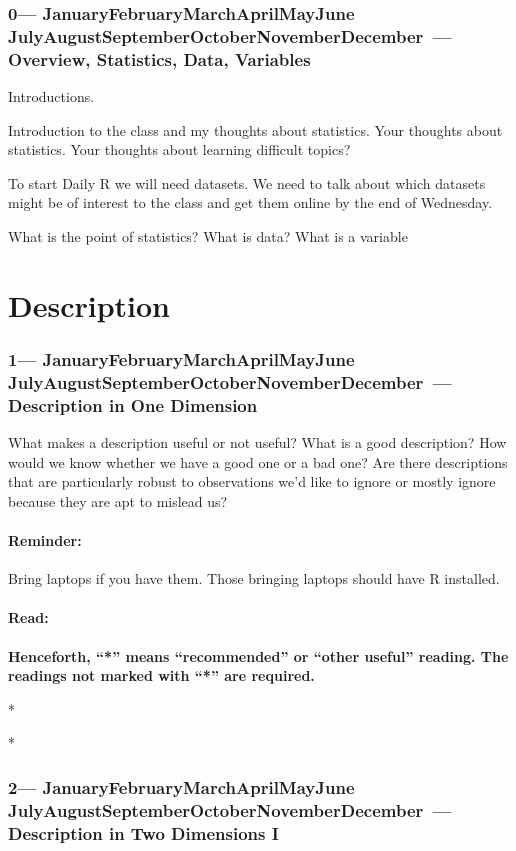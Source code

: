 \documentclass[10pt]{article}
\def\themonth{\ifcase\month\or
	January\or February\or March\or April\or May\or June\or
	July\or August\or September\or October\or November\or December\fi}
\begin{document}
\SetDate[23/08/2015]

\section{0---\themonth~\the\day--- Overview, Statistics, Data, Variables}

Introductions.

Introduction to the class and my thoughts about statistics. Your thoughts
about statistics. Your thoughts about learning difficult topics?

To start Daily R we will need datasets. We need to talk about which datasets
might be of interest to the class and get them online by the end of Wednesday.

What is the point of statistics? What is data? What is a variable

\part{Description}


\AdvanceDate[7]
\section{1---\themonth~\the\day---Description in One Dimension}

What makes a description useful or not useful? What is a good description? How
would we know whether we have a good one or a bad one? Are there descriptions
that are particularly robust to observations we'd like to ignore or mostly
ignore because they are apt to mislead us?

\subsection{Reminder:} Bring laptops if you have them. Those bringing
laptops should have R installed.

\subsection{Read:}
\textbf{Henceforth, ``*'' means ``recommended'' or ``other useful'' reading. The readings not marked with ``*'' are required.}

*\citealp[Chap 1--3]{wilcox2012introduction}

*\citealp[Chap 2--3]{kaplan2012ism}


\AdvanceDate[7]
\section{2---\themonth~\the\day---Description in Two Dimensions I}
\end{document}
